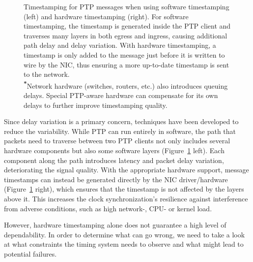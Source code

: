 \begin{figure}
    \caption{
        Timestamping for PTP messages when using software timestamping (left) and hardware timestamping (right). For software timestamping, the timestamp is generated inside the PTP client and traverses many layers in both egress and ingress, causing additional path delay and delay variation. With hardware timestamping, a timestamp is only added to the message just before it is written to wire by the NIC, thus ensuring a more up-to-date timestamp is sent to the network.\\
        \textsuperscript{\textbf{*}}Network hardware (switches, routers, etc.) also introduces queuing delays. Special PTP-aware hardware can compensate for its own delays to further improve timestamping quality.
    }
    \label{fig:ptp-sw-hw}
\end{figure}

Since delay variation is a primary concern, techniques have been developed to reduce the variability. While PTP can run entirely in software, the path that packets need to traverse between two PTP clients not only includes several hardware components but also some software layers (Figure~\ref{fig:ptp-sw-hw} left). Each component along the path introduces latency and packet delay variation, deteriorating the signal quality. With the appropriate hardware support, message timestamps can instead be generated directly by the NIC driver/hardware (Figure~\ref{fig:ptp-sw-hw} right), which ensures that the timestamp is not affected by the layers above it. This increases the clock synchronization's resilience against interference from adverse conditions, such as high network-, CPU- or kernel load.

However, hardware timestamping alone does not guarantee a high level of dependability. In order to determine what can go wrong, we need to take a look at what constraints the timing system needs to observe and what might lead to potential failures.
